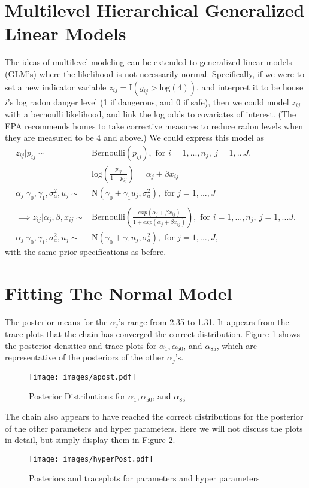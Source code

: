 \documentclass{article}
\def\beginmyfig{\begin{figure}[htbp]\begin{center}}
\def\endmyfig{\end{center}\end{figure}}
\begin{document}
\section{Multilevel Hierarchical Generalized Linear Models}
The ideas of multilevel modeling can be extended to generalized linear models
(GLM's) where the likelihood is not necessarily normal. Specifically, if we
were to set a new indicator variable $z_{ij} = \text{I}(y_{ij}>\text{log}(4))$,
and interpret it to be house $i$'s log radon danger level (1 if dangerous, and
0 if safe), then we could model $z_{ij}$ with a bernoulli likelihood, and link
the log odds to covariates of interest. (The EPA recommends homes to take
corrective measures to reduce radon levels when they are measured to be 4 and
above.) We could express this model as
\begin{align*}
  z_{ij}|p_{ij} \sim & \text{Bernoulli}(p_{ij}),\text{ for }i=1,...,n_j,~j=1,...J.\\
  &\text{log}\left(\frac{p_{ij}}{1-p_{ij}}\right) = \alpha_j+\beta x_{ij}\\
  \alpha_{j}|\gamma_0,\gamma_1,\sigma_a^2,u_j \sim & \text{N}(\gamma_0 +
      \gamma_1 u_j,\sigma_a^2),\text{ for }j=1,...,J\\
  \\
  \implies
  z_{ij}|\alpha_j,\beta,x_{ij} \sim &
      \text{Bernoulli}\left(\frac{exp(\alpha_j+\beta x_{ij})}{1+exp(\alpha_j+\beta
      x_{ij})}\right),\text{ for }i=1,...,n_j,~j=1,...J.\\
  \alpha_{j}|\gamma_0,\gamma_1,\sigma_a^2,u_j \sim & \text{N}(\gamma_0 +
      \gamma_1 u_j,\sigma_a^2),\text{ for }j=1,...,J,
\end{align*}
with the same prior specifications as before.

\section{Fitting The Normal Model}
The posterior means for the $\alpha_j$'s range from 2.35 to 1.31. It appears from the trace
plots that the chain has converged the correct distribution. Figure 1 shows the posterior
densities and trace plots for $\alpha_1,\alpha_{50}$, and $\alpha_{85}$, which are representative
of the posteriors of the other $\alpha_j$'s.

\beginmyfig \texttt{[image: images/apost.pdf]} 
            \caption{Posterior Distributions for $\alpha_1,\alpha_{50}$, and $\alpha_{85}$} \endmyfig 

\noindent
The chain also appears to have reached the correct distributions for the posterior of the other parameters
and hyper parameters. Here we will not discuss the plots in detail, but simply display them in Figure 2.
\beginmyfig \texttt{[image: images/hyperPost.pdf]} 
            \caption{Posteriors and traceplots for parameters and hyper parameters}\endmyfig 
\end{document}
